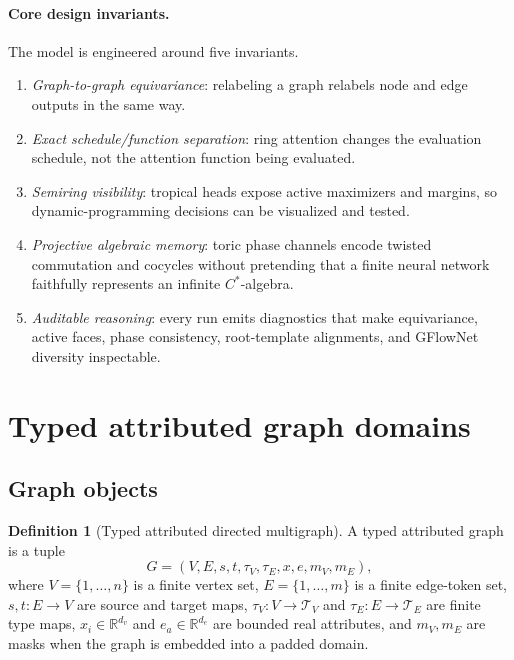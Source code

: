 \documentclass[11pt]{article}
\theoremstyle{definition}
\newtheorem{definition}{Definition}[section]
\theoremstyle{plain}
\theoremstyle{remark}
\numberwithin{equation}{section}
\newcommand{\R}{\mathbb{R}}
\begin{document}
\paragraph{Core design invariants.}
The model is engineered around five invariants.
\begin{enumerate}[leftmargin=2em]
  \item \emph{Graph-to-graph equivariance}: relabeling a graph relabels node and edge outputs in the same way.
  \item \emph{Exact schedule/function separation}: ring attention changes the evaluation schedule, not the attention function being evaluated.
  \item \emph{Semiring visibility}: tropical heads expose active maximizers and margins, so dynamic-programming decisions can be visualized and tested.
  \item \emph{Projective algebraic memory}: toric phase channels encode twisted commutation and cocycles without pretending that a finite neural network faithfully represents an infinite $C^*$-algebra.
  \item \emph{Auditable reasoning}: every run emits diagnostics that make equivariance, active faces, phase consistency, root-template alignments, and GFlowNet diversity inspectable.
\end{enumerate}

\section{Typed attributed graph domains}

\subsection{Graph objects}

\begin{definition}[Typed attributed directed multigraph]
A typed attributed graph is a tuple
\begin{equation}
  G=(V,E,s,t,\tau_V,\tau_E,x,e,m_V,m_E),
\end{equation}
where $V=\{1,\ldots,n\}$ is a finite vertex set, $E=\{1,\ldots,m\}$ is a finite edge-token set, $s,t:E\to V$ are source and target maps, $\tau_V:V\to\mathcal T_V$ and $\tau_E:E\to\mathcal T_E$ are finite type maps, $x_i\in\R^{d_v}$ and $e_a\in\R^{d_e}$ are bounded real attributes, and $m_V,m_E$ are masks when the graph is embedded into a padded domain.
\end{definition}
\end{document}
